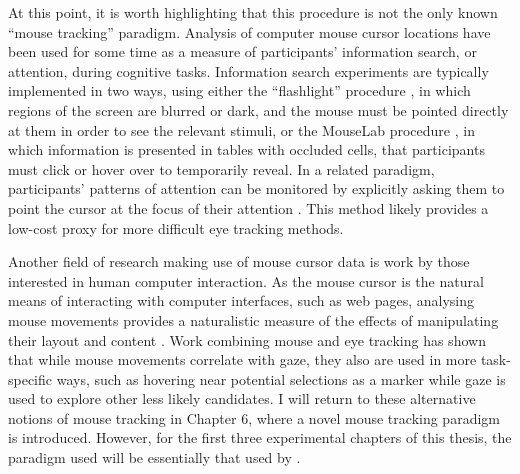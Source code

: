 At this point, it is worth highlighting that this procedure
is not the only known ``mouse tracking'' paradigm.
Analysis of computer mouse cursor locations
have been used for some time as a measure of 
participants' information search, or attention,
during cognitive tasks.
Information search experiments are typically implemented in two ways,
using either the ``flashlight'' procedure 
\citep{Schulte-Mecklenbeck2011, Yamauchi2007},
in which regions of the screen are blurred or dark,
and the mouse must be pointed directly at them in order to see the relevant stimuli,
or the MouseLab procedure \citep{Willemsen2011},
in which information is presented in tables with occluded cells,
that participants must click or hover over to temporarily reveal.
In a related paradigm, participants' patterns of attention
can be monitored by explicitly asking them
to point the cursor at the focus of their attention
\citep{Evans1996, Evans2010, Stupple2008}.
This method likely provides a low-cost proxy
for more difficult eye tracking methods.

Another field of research making use of mouse cursor data
is work by those interested in human computer interaction.
As the mouse cursor is the natural means
of interacting with computer interfaces, such as web pages,
analysing mouse movements provides a naturalistic measure of 
the effects of manipulating their layout and content
\citep[e.g.][]{Huang2011, Cox2006}.
Work combining mouse and eye tracking \citep{Chen2001, Rodden2008}
has shown that while mouse movements correlate with gaze,
they also are used in more task-specific ways, 
such as hovering near potential selections as a marker
while gaze is used to explore other less likely candidates.
I will return to these alternative notions of mouse tracking in Chapter 6,
where a novel mouse tracking paradigm is introduced.
However, for the first three experimental chapters of this thesis,
the paradigm used will be essentially that used by \citet{Spivey2005}.

